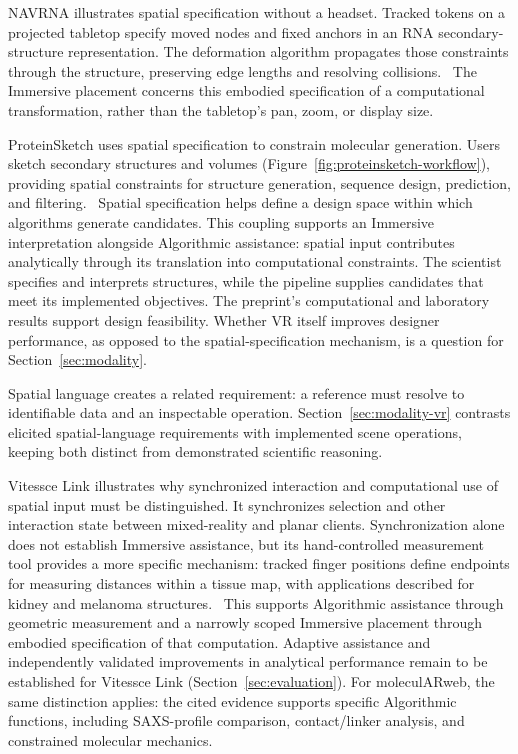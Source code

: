 NAVRNA illustrates spatial specification without a headset. Tracked tokens on a projected tabletop specify moved nodes and fixed anchors in an RNA secondary-structure representation. The deformation algorithm propagates those constraints through the structure, preserving edge lengths and resolving collisions.~\cite{NewNAVRNA2006} The Immersive placement concerns this embodied specification of a computational transformation, rather than the tabletop's pan, zoom, or display size.

ProteinSketch uses spatial specification to constrain molecular generation. Users sketch secondary structures and volumes (Figure~\ref{fig:proteinsketch-workflow}), providing spatial constraints for structure generation, sequence design, prediction, and filtering.~\cite{AnchorProteinSketch} Spatial specification helps define a design space within which algorithms generate candidates. This coupling supports an Immersive interpretation alongside Algorithmic assistance: spatial input contributes analytically through its translation into computational constraints. The scientist specifies and interprets structures, while the pipeline supplies candidates that meet its implemented objectives. The preprint's computational and laboratory results support design feasibility. Whether VR itself improves designer performance, as opposed to the spatial-specification mechanism, is a question for Section~\ref{sec:modality}.



Spatial language creates a related requirement: a reference must resolve to identifiable data and an inspectable operation. Section~\ref{sec:modality-vr} contrasts elicited spatial-language requirements with implemented scene operations, keeping both distinct from demonstrated scientific reasoning.

Vitessce Link illustrates why synchronized interaction and computational use of spatial input must be distinguished. It synchronizes selection and other interaction state between mixed-reality and planar clients. Synchronization alone does not establish Immersive assistance, but its hand-controlled measurement tool provides a more specific mechanism: tracked finger positions define endpoints for measuring distances within a tissue map, with applications described for kidney and melanoma structures.~\cite{ExpansionX015} This supports Algorithmic assistance through geometric measurement and a narrowly scoped Immersive placement through embodied specification of that
computation. Adaptive assistance and independently validated improvements in analytical performance remain to be established for Vitessce Link (Section~\ref{sec:evaluation}). For moleculARweb, the same distinction applies: the cited evidence supports specific Algorithmic functions, including SAXS-profile comparison, contact/linker analysis, and constrained molecular mechanics.~\cite{ExpansionX012,ExpansionX128}


